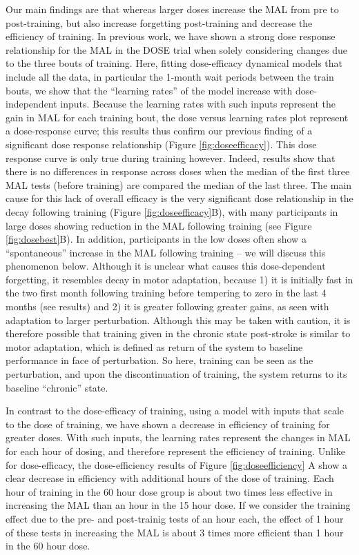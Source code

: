 Our main findings are that whereas larger doses increase the MAL from pre to post-training, but also increase forgetting post-training and decrease the efficiency of training. 
In previous work, we have shown a strong dose response relationship for the MAL in the DOSE trial when solely considering changes due to the three bouts of training. 
Here, fitting dose-efficacy dynamical models that include all the data, in particular the 1-month wait periods between the train bouts, we show that the “learning rates” of the model increase with dose-independent inputs. 
Because the learning rates with such inputs represent the gain in MAL for each training bout, the dose versus learning rates plot represent a dose-response curve; this results thus confirm our previous finding of a significant dose response relationship (Figure \ref{fig:doseefficacy}). 
This dose response curve is only true during training however. 
Indeed, results show that there is no differences in response across doses when the median of the first three MAL tests (before training) are compared the median of the last three. 
The main cause for this lack of overall efficacy is the very significant dose relationship in the decay following training (Figure \ref{fig:doseefficacy}B), with many participants in large doses showing reduction in the MAL following training (see Figure \ref{fig:dosebest}B). 
In addition, participants in the low doses often show a “spontaneous” increase in the MAL following training -- we will discuss this phenomenon below. 
Although it is unclear  what causes this dose-dependent forgetting, it resembles decay in motor adaptation, because 1) it is initially fast in the two first month following training before tempering to zero in the last 4 months (see results) and 2) it is greater following greater gains, as seen with adaptation to larger perturbation. 
Although this may be taken with caution, it is therefore possible that training given in the chronic state post-stroke is similar to motor adaptation, which is defined as return of the system to baseline performance in face of perturbation. 
So here, training can be seen as the perturbation, and upon the discontinuation of training, the system returns to its baseline “chronic” state. 

In contrast to the dose-efficacy of training, using a model with inputs that scale to the dose of training, we have shown a decrease in efficiency of training for greater doses. 
With such inputs, the learning rates represent the changes in MAL for each hour of dosing, and therefore represent the efficiency of training. 
Unlike for dose-efficacy, the dose-efficiency results of Figure \ref{fig:doseefficiency} A show a clear decrease in efficiency with additional hours of the dose of training. 
Each hour of training in the 60 hour dose group is about two times less effective in increasing the MAL than an hour in the 15 hour dose. 
If we consider the training effect due to the pre- and post-trainig tests of an hour each, the effect of 1 hour of these tests in increasing the MAL is about 3 times more efficient than 1 hour in the 60 hour dose. 

